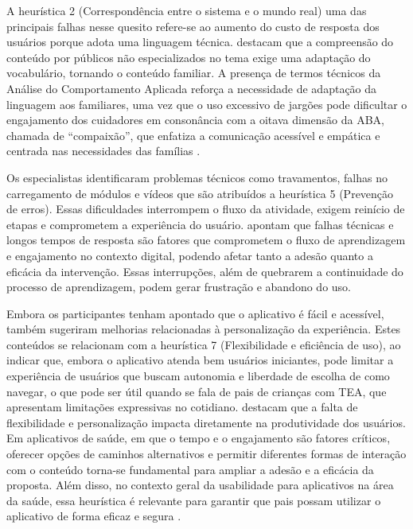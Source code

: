 \documentclass[portuguese]{textolivre}
\begin{document}
A heurística 2 (Correspondência entre o sistema e o mundo real) uma das principais falhas nesse quesito refere-se ao aumento do custo de resposta dos usuários porque adota uma linguagem técnica. \textcite{stonbraker2018usability} destacam que a compreensão do conteúdo por públicos não especializados no tema exige uma adaptação do vocabulário, tornando o conteúdo familiar. A presença de termos técnicos da Análise do Comportamento Aplicada reforça a necessidade de adaptação da linguagem aos familiares, uma vez que o uso excessivo de jargões pode dificultar o engajamento dos cuidadores em consonância com a oitava dimensão da ABA, chamada de “compaixão”, que enfatiza a comunicação acessível e empática e centrada nas necessidades das famílias \cite{penney2023compassion}.

Os especialistas identificaram problemas técnicos como travamentos, falhas no carregamento de módulos e vídeos que são atribuídos a heurística 5 (Prevenção de erros). Essas dificuldades interrompem o fluxo da atividade, exigem reinício de etapas e comprometem a experiência do usuário. \textcite{bouraghi2022evaluating} apontam que falhas técnicas e longos tempos de resposta são fatores que comprometem o fluxo de aprendizagem e engajamento no contexto digital, podendo afetar tanto a adesão quanto a eficácia da intervenção. Essas interrupções, além de quebrarem a continuidade do processo de aprendizagem, podem gerar frustração e abandono do uso.

Embora os participantes tenham apontado que o aplicativo é fácil e acessível, também sugeriram melhorias relacionadas à personalização da experiência. Estes conteúdos se relacionam com a heurística 7 (Flexibilidade e eficiência de uso), ao indicar que, embora o aplicativo atenda bem usuários iniciantes, pode limitar a experiência de usuários que buscam autonomia e liberdade de escolha de como navegar, o que pode ser útil quando se fala de pais de crianças com TEA, que apresentam limitações expressivas no cotidiano. \textcite{bouraghi2022evaluating} destacam que a falta de flexibilidade e personalização impacta diretamente na produtividade dos usuários. Em aplicativos de saúde, em que o tempo e o engajamento são fatores críticos, oferecer opções de caminhos alternativos e permitir diferentes formas de interação com o conteúdo torna-se fundamental para ampliar a adesão e a eficácia da proposta. Além disso, no contexto geral da usabilidade para aplicativos na área da saúde, essa heurística é relevante para garantir que pais possam utilizar o aplicativo de forma eficaz e segura \cite{galavi2024heuristics}.
\end{document}
